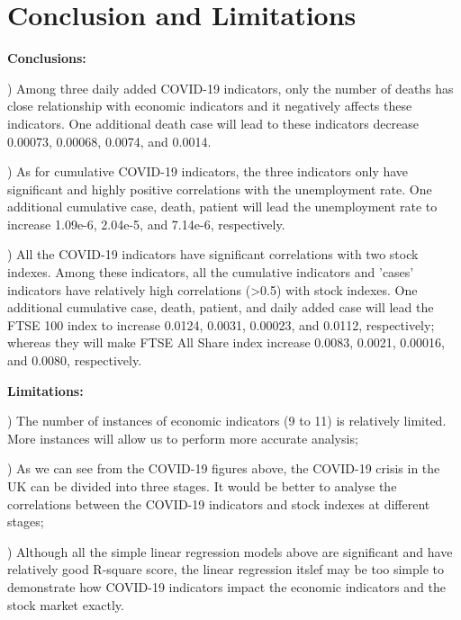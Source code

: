 \documentclass[12pt, a4paper]{report}
\begin{document}
\section{Conclusion and Limitations}
\textbf{Conclusions:}\par
{}) Among three daily added COVID-19 indicators, only the number of deaths has close
relationship with economic indicators and it negatively affects these indicators.
One additional death case will lead to these indicators decrease 0.00073, 0.00068, 0.0074, and 0.0014.\par
{}) As for cumulative COVID-19 indicators, the three indicators only have significant and highly positive correlations
with the unemployment rate. One additional cumulative case, death, patient will lead the unemployment rate to increase 1.09e-6, 2.04e-5, and 7.14e-6, respectively.\par
{}) All the COVID-19 indicators have significant correlations with two stock indexes. Among these indicators, all the cumulative indicators and 
'cases' indicators have relatively high correlations (>0.5) with stock indexes. One additional cumulative case, death, patient, and daily added case will lead the 
FTSE 100 index to increase 0.0124, 0.0031, 0.00023, and 0.0112, respectively; whereas they will make FTSE All Share index increase 0.0083, 0.0021, 0.00016, and 0.0080, 
respectively.\par

\hspace*{\fill}

\noindent
\textbf{Limitations:}\par
{}) The number of instances of economic indicators (9 to 11) is relatively limited. More instances will allow us to perform more accurate analysis;\par
{}) As we can see from the COVID-19 figures above, the COVID-19 crisis in the UK can be divided into three stages. It would be 
better to analyse the correlations between the COVID-19 indicators and stock indexes at different stages;\par
{}) Although all the simple linear regression models above are significant and have relatively good R-square score, the linear regression itslef may be 
too simple to demonstrate how COVID-19 indicators impact the economic indicators and the stock market exactly.\par
\end{document}
